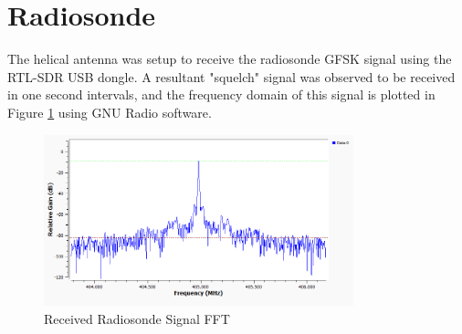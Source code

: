 \graphicspath{{./figures}}

\section{Radiosonde}

The helical antenna was setup to receive the radiosonde GFSK signal using the RTL-SDR USB dongle. A resultant "squelch" signal was observed to be received in one second intervals, and the frequency domain of this signal is plotted in Figure \ref{fig:radiosondeSpectrum} using GNU Radio software.

\begin{figure}[!htb]
  \centering
  \includegraphics[width=0.8\textwidth]{radiosondeSpectrum}
  \caption{Received Radiosonde Signal FFT}
  \label{fig:radiosondeSpectrum}
\end{figure}
